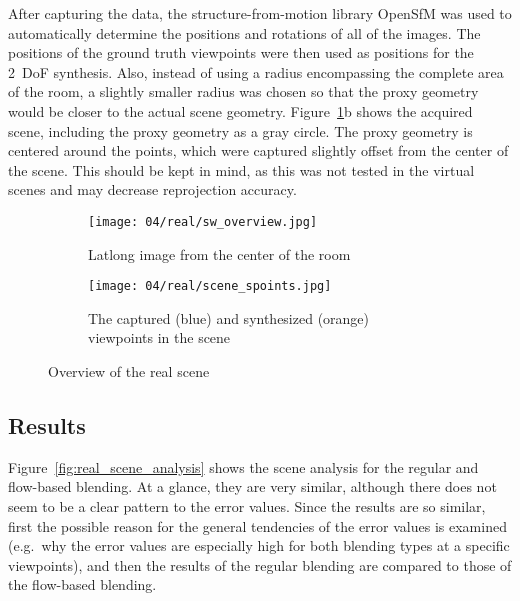 After capturing the data, the structure-from-motion library OpenSfM \cite{opensfm} was used to automatically determine the positions and rotations of all of the images. The positions of the ground truth viewpoints were then used as positions for the 2~DoF synthesis.
Also, instead of using a radius encompassing the complete area of the room, a slightly smaller radius was chosen so that the proxy geometry would be closer to the actual scene geometry. Figure~\ref{fig:real_setup}b shows the acquired scene, including the proxy geometry as a gray circle. The proxy geometry is centered around the points, which were captured slightly offset from the center of the scene. This should be kept in mind, as this was not tested in the virtual scenes and may decrease reprojection accuracy.

\begin{figure}
\centering
    \hfill
    \begin{subfigure}[c]{0.65\textwidth}
            \centering
            \texttt{[image: 04/real/sw\_overview.jpg]}
            \caption{Latlong image from the center of the room}
    \end{subfigure}
    \hfill
    \begin{subfigure}[c]{0.33\textwidth}
            \centering
            \texttt{[image: 04/real/scene\_spoints.jpg]}
            \caption{The captured (blue) and synthesized (orange) viewpoints in the scene}
    \end{subfigure}
    \hfill
  \caption{Overview of the real scene}
  \label{fig:real_setup}
\end{figure}


\subsection{Results}
Figure~\ref{fig:real_scene_analysis} shows the scene analysis for the regular and flow-based blending. At a glance, they are very similar, although there does not seem to be a clear pattern to the error values. Since the results are so similar, first the possible reason for the general tendencies of the error values is examined (e.g.\ why the error values are especially high for both blending types at a specific viewpoints), and then the results of the regular blending are compared to those of the flow-based blending.

